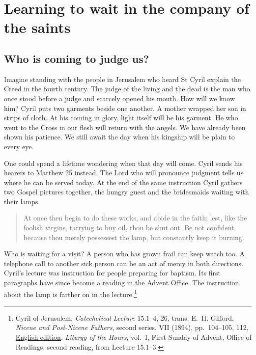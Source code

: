 \section{Learning to wait in the company of the saints}

\subsection{Who is coming to judge us?}

Imagine standing with the people in Jerusalem who heard St Cyril explain
the Creed in the fourth century. The judge of the living and the dead is
the man who once stood before a judge and scarcely opened his mouth. How
will we know him? Cyril puts two garments beside one another. A mother
wrapped her son in strips of cloth. At his coming in glory, light itself
will be his garment. He who went to the Cross in our flesh will return with
the angels. We have already been shown his patience. We still await the
day when his kingship will be plain to every eye.

One could spend a lifetime wondering when that day will come. Cyril sends
his hearers to Matthew 25 instead. The Lord who will pronounce judgment
tells us where he can be served today. At the end of the same instruction
Cyril gathers two Gospel pictures together, the hungry guest and the
bridesmaids waiting with their lamps.

\begin{quote}
At once then begin to do these works, and abide in the faith; lest, like
the foolish virgins, tarrying to buy oil, thou be shut out. Be not confident
because thou merely possessest the lamp, but constantly keep it burning.
\end{quote}

Who is waiting for a visit? A person who has grown frail can keep watch too.
A telephone call to another sick person can be an act of mercy in both
directions. Cyril's lecture was instruction for people preparing for baptism.
Its first paragraphs have since become a reading in the Advent Office. The
instruction about the lamp is farther on in the lecture.\footnote{Cyril of
Jerusalem, \emph{Catechetical Lecture} 15.1--4, 26, trans. E.~H. Gifford,
\emph{Nicene and Post-Nicene Fathers}, second series, VII (1894), pp.~104--105,
112, \href{https://www.ccel.org/ccel/schaff/npnf207.html}{English edition}.
\emph{Liturgy of the Hours}, vol.~I, First Sunday of Advent, Office of
Readings, second reading, from Lecture 15.1--3.}

